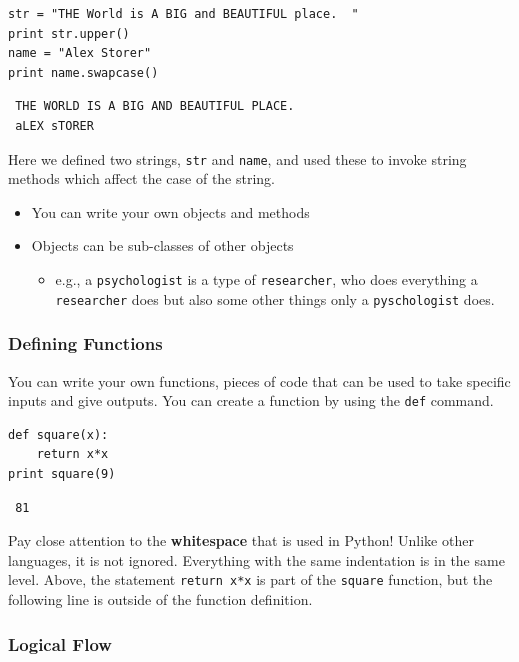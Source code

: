 \documentclass[11pt]{article}
\begin{document}
\begin{verbatim}
str = "THE World is A BIG and BEAUTIFUL place.  "
print str.upper()
name = "Alex Storer"
print name.swapcase()
\end{verbatim}

\begin{verbatim}
 THE WORLD IS A BIG AND BEAUTIFUL PLACE.  
 aLEX sTORER
\end{verbatim}

Here we defined two strings, \texttt{str} and \texttt{name}, and used these to
invoke string methods which affect the case of the string.

\begin{itemize}
\item You can write your own objects and methods
\item Objects can be sub-classes of other objects
\begin{itemize}
\item e.g., a \texttt{psychologist} is a type of \texttt{researcher}, who does
    everything a \texttt{researcher} does but also some other things only
    a \texttt{pyschologist} does.
\end{itemize}
\end{itemize}
\subsubsection{Defining Functions}
\label{sec-2-3-5}


You can write your own functions, pieces of code that can be used to
take specific inputs and give outputs.  You can create a function by
using the \texttt{def} command.


\begin{verbatim}
def square(x):
    return x*x
print square(9)
\end{verbatim}

\begin{verbatim}
 81
\end{verbatim}

Pay close attention to the \textbf{whitespace} that is used in Python!
Unlike other languages, it is not ignored.  Everything with the same
indentation is in the same level.  Above, the statement \texttt{return x*x}
is part of the \texttt{square} function, but the following line is outside of
the function definition.
\subsubsection{Logical Flow}
\label{sec-2-3-6}
\end{document}
